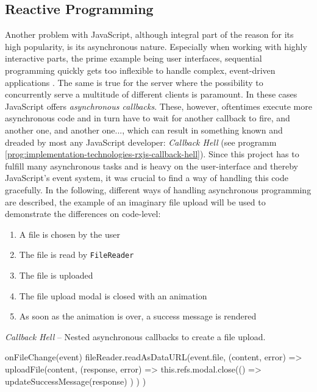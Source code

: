 \subsection{Reactive Programming}
\label{sec:implementation-technologies-rxjs}

Another problem with JavaScript, although integral part of the reason for its high popularity, is its asynchronous nature. Especially when working with highly interactive parts, the prime example being user interfaces, sequential programming quickly gets too inflexible to handle complex, event-driven applications \cite{reactive-programming-survey}. The same is true for the server where the possibility to concurrently serve a multitude of different clients is paramount. In these cases JavaScript offers \emph{asynchronous callbacks}. These, however, oftentimes execute more asynchronous code and in turn have to wait for another callback to fire, and another one, and another one..., which can result in something known and dreaded by most any JavaScript developer: \emph{Callback Hell} (see programm \ref{prog:implementation-technologies-rxjs-callback-hell}). Since this project has to fulfill many asynchronous tasks and is heavy on the user-interface and thereby JavaScript's event system, it was crucial to find a way of handling this code gracefully. In the following, different ways of handling asynchronous programming are described, the example of an imaginary file upload will be used to demonstrate the differences on code-level:
\begin{enumerate}
\item A file is chosen by the user
\item The file is read by \texttt{FileReader}
\item The file is uploaded
\item The file upload modal is closed with an animation
\item As soon as the animation is over, a success message is rendered
\end{enumerate}

\begin{program}
\caption{\emph{Callback Hell} -- Nested asynchronous callbacks to create a file upload.}
\label{prog:implementation-technologies-rxjs-callback-hell}
\begin{JsCode}
onFileChange(event) {
  fileReader.readAsDataURL(event.file, (content, error) => {
    uploadFile(content, (response, error) => {
      this.refs.modal.close(() => {
        updateSuccessMessage(response)
      })
    })
  })
}
\end{JsCode}
\end{program}

